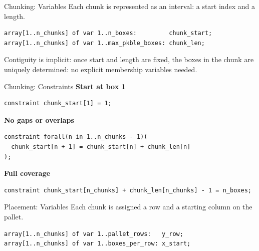 \documentclass[aspectratio=169,xcolor=dvipsnames]{beamer}
\begin{document}

\begin{frame}[fragile]{Chunking: Variables}
    Each chunk is represented as an interval: a start index and a length.

    \vspace{0.4cm}
    \begin{lstlisting}
array[1..n_chunks] of var 1..n_boxes:         chunk_start;
array[1..n_chunks] of var 1..max_pkble_boxes: chunk_len;
    \end{lstlisting}

    \vspace{0.4cm}
    \small
    Contiguity is implicit: once start and length are fixed, the boxes in the chunk
    are uniquely determined: no explicit membership variables needed.
\end{frame}


\begin{frame}[fragile]{Chunking: Constraints}
    \textbf{Start at box 1}
    \begin{lstlisting}
constraint chunk_start[1] = 1;
    \end{lstlisting}

    \vspace{0.25cm}
    \textbf{No gaps or overlaps}
    \begin{lstlisting}
constraint forall(n in 1..n_chunks - 1)(
  chunk_start[n + 1] = chunk_start[n] + chunk_len[n]
);
    \end{lstlisting}

    \vspace{0.25cm}
    \textbf{Full coverage}
    \begin{lstlisting}
constraint chunk_start[n_chunks] + chunk_len[n_chunks] - 1 = n_boxes;
    \end{lstlisting}
\end{frame}


\begin{frame}[fragile]{Placement: Variables}
    Each chunk is assigned a row and a starting column on the pallet.

    \vspace{0.4cm}
    \begin{lstlisting}
array[1..n_chunks] of var 1..pallet_rows:   y_row;
array[1..n_chunks] of var 1..boxes_per_row: x_start;
    \end{lstlisting}
\end{frame}
\end{document}
